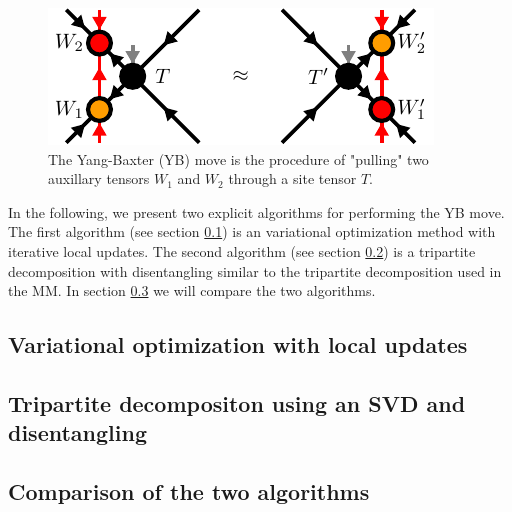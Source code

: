 \begin{figure}
	\centering
	\includegraphics[scale=1]{figures/tikz/disoTPS/yang_baxter_move/yang_baxter_move.pdf}
	\caption{The Yang-Baxter (YB) move is the procedure of "pulling" two auxillary tensors $W_1$ and $W_2$ through a site tensor $T$.}
	\label{fig:disoTPS_YB_move_closeup}
\end{figure}
In the following, we present two explicit algorithms for performing the YB move. The first algorithm (see section \ref{sec:YB_move_iterative_local_optimization}) is an variational optimization method with iterative local updates. The second algorithm (see section \ref{sec:YB_move_svd_disentangle}) is a tripartite decomposition with disentangling similar to the tripartite decomposition used in the MM. In section \ref{sec:YB_move_comparison} we will compare the two algorithms.

\subsection{Variational optimization with local updates}
\label{sec:YB_move_iterative_local_optimization}


\subsection{Tripartite decompositon using an SVD and disentangling}
\label{sec:YB_move_svd_disentangle}


\subsection{Comparison of the two algorithms}
\label{sec:YB_move_comparison}
